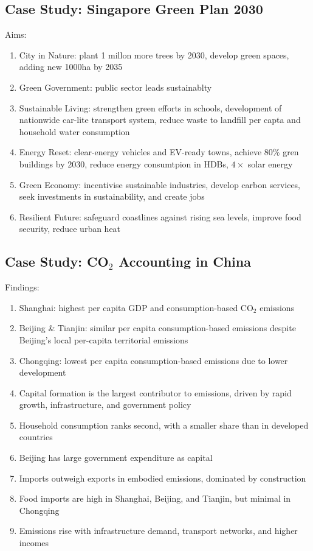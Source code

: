 \documentclass[12pt, a4paper]{article}
\begin{document}
\begin{multicols*}{3}
\subsection{Case Study: Singapore Green Plan 2030} 
Aims:
\begin{enumerate}[\roman*.]
  \item City in Nature: plant 1 millon more trees by 2030, develop green spaces, adding new 1000ha by 2035
  \item Green Government: public sector leads sustainablty
  \item Sustainable Living: strengthen green efforts in schools, development of nationwide car-lite transport system, reduce waste to landfill per capta and household water consumption
  \item Energy Reset: clear-energy vehicles and EV-ready towns, achieve 80\% gren buildings by 2030, reduce energy consumtpion in HDBs, $4\times$ solar energy 
  \item Green Economy: incentivise sustainable industries, develop carbon services, seek investments in sustainability, and create jobs
  \item Resilient Future: safeguard coastlines against rising sea levels, improve food security, reduce urban heat
\end{enumerate}

\subsection{Case Study: CO$_2$ Accounting in China}
Findings:
\begin{enumerate}[\roman*.]
  \item {Shanghai:} highest per capita GDP and consumption-based CO$_2$ emissions
  \item {Beijing \& Tianjin:} similar per capita consumption-based emissions despite Beijing's local per-capita territorial emissions
  \item {Chongqing:} lowest per capita consumption-based emissions due to lower development
  \item Capital formation is the largest contributor to emissions, driven by rapid growth, infrastructure, and government policy
  \item Household consumption ranks second, with a smaller share than in developed countries
  \item Beijing has large government expenditure as capital
  \item Imports outweigh exports in embodied emissions, dominated by construction
  \item Food imports are high in Shanghai, Beijing, and Tianjin, but minimal in Chongqing
  \item Emissions rise with infrastructure demand, transport networks, and higher incomes
\end{enumerate}
\vspace{-1em}
\colbreak

\end{multicols*}
\end{document}

